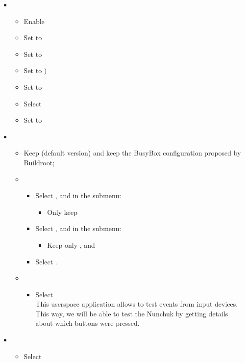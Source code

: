 \begin{itemize}
\item {}
  \begin{itemize}
  \item Enable 
  \item Set  to 
  \item Set  to 
  \item Set  to )
  \item Set  to 
  \item Select 
  \item Set  to
\end{itemize}
\item {}
  \begin{itemize}
  \item Keep  (default version) and keep the BusyBox
    configuration proposed by Buildroot;
  \item {}
    \begin{itemize}
    \item Select , and in the submenu:
    \begin{itemize}
         \item Only keep 
    \end{itemize}
    \item Select , and in the submenu:
    \begin{itemize}
         \item Keep only ,  and 
    \end{itemize}
    \item Select .
    \end{itemize}
  \item {}
    \begin{itemize}
	 \item Select \\
	       This userspace application allows to test events from
	       input devices. This way, we will be able to test the
	       Nunchuk by getting details about which buttons were
	       pressed.
    \end{itemize}
  \end{itemize}
\item {}
  \begin{itemize}
  \item Select 
  \end{itemize}
\end{itemize}

